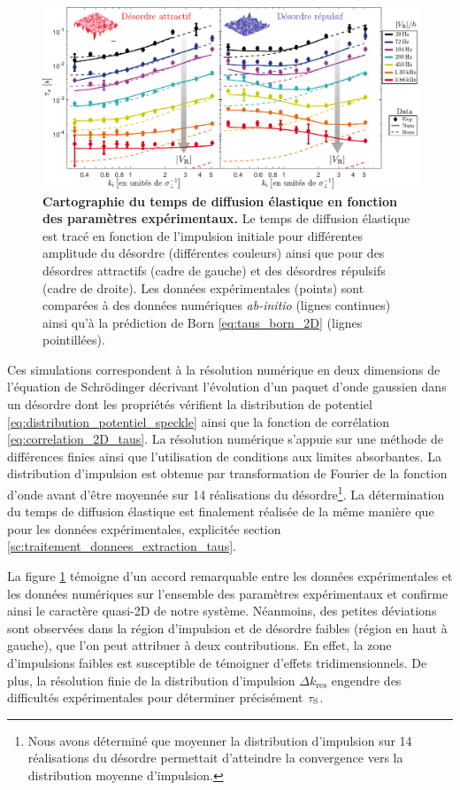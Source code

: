 \begin{figure}
\centering
\includegraphics[width=\textwidth]{Fig/TauS_PRL/donnees_taus_prl.pdf}
\caption{\textbf{Cartographie du temps de diffusion élastique en fonction des paramètres expérimentaux.} Le temps de diffusion élastique est tracé en fonction de l'impulsion initiale pour différentes amplitude du désordre (différentes couleurs) ainsi que pour des désordres attractifs (cadre de gauche) et des désordres répulsifs (cadre de droite). Les données expérimentales (points) sont comparées à des données numériques \textit{ab-initio} (lignes continues) ainsi qu'à la prédiction de Born \ref{eq:taus_born_2D} (lignes pointillées).}
\label{fig:donnees_taus_prl}
\end{figure}

Ces simulations correspondent à la résolution numérique en deux dimensions de l'équation de Schrödinger décrivant l'évolution d'un paquet d'onde gaussien dans un désordre dont les propriétés vérifient la distribution de potentiel \ref{eq:distribution_potentiel_speckle} ainsi que la fonction de corrélation \ref{eq:correlation_2D_taus}. La résolution numérique s'appuie sur une méthode de différences finies ainsi que l'utilisation de conditions aux limites absorbantes. La distribution d'impulsion est obtenue par transformation de Fourier de la fonction d'onde avant d'être moyennée sur 14 réalisations du désordre\footnote{Nous avons déterminé que moyenner la distribution d'impulsion sur 14 réalisations du désordre permettait d'atteindre la convergence vers la distribution moyenne d'impulsion.}. La détermination du temps de diffusion élastique est finalement réalisée de la même manière que pour les données expérimentales, explicitée section \ref{sc:traitement_donnees_extraction_taus}.

La figure \ref{fig:donnees_taus_prl} témoigne d'un accord remarquable entre les données expérimentales et les données numériques sur l'ensemble des paramètres expérimentaux et confirme ainsi le caractère quasi-2D de notre système. Néanmoins, des petites déviations sont observées dans la région d'impulsion et de désordre faibles (région en haut à gauche), que l'on peut attribuer à deux contributions. En effet, la zone d'impulsions faibles est susceptible de témoigner d'effets tridimensionnels. De plus, la résolution finie de la distribution d'impulsion $\Delta k_{\mathrm{res}}$ engendre des difficultés expérimentales pour déterminer précisément $\tau_{\mathrm{S}}$.


